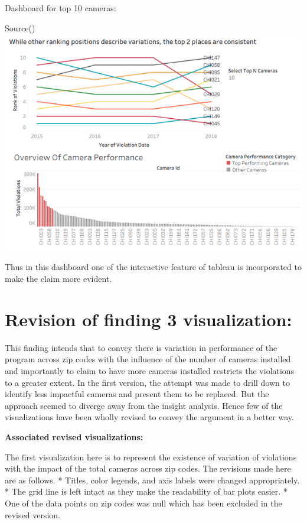 \documentclass[]{book}
\begin{document}
Dashboard for top 10 cameras:

Source(\citet{revised})
\includegraphics{images/Rev_img8.png}

Thus in this dashboard one of the interactive feature of tableau is incorporated to make the claim more evident.

\hypertarget{revision-of-finding-3-visualization}{%
\section{Revision of finding 3 visualization:}\label{revision-of-finding-3-visualization}}

This finding intends that to convey there is variation in performance of the program across zip codes with the influence of the number of cameras installed and importantly to claim to have more cameras installed restricts the violations to a greater extent. In the first version, the attempt was made to drill down to identify less impactful cameras and present them to be replaced. But the approach seemed to diverge away from the insight analysis. Hence few of the visualizations have been wholly revised to convey the argument in a better way.

\textbf{Associated revised visualizations:}

The first visualization here is to represent the existence of variation of violations with the impact of the total cameras across zip codes. The revisions made here are as follows.
* Titles, color legends, and axis labels were changed appropriately.
* The grid line is left intact as they make the readability of bar plots easier.
* One of the data points on zip codes was null which has been excluded in the revised version.
\end{document}
